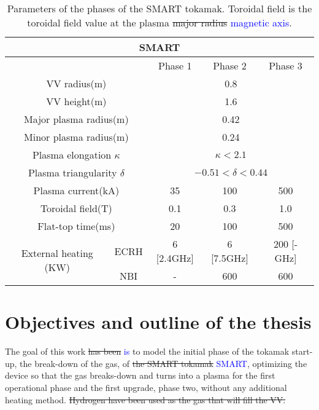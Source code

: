 \documentclass[a4paper,12pt,oneside]{book}
\begin{document}
\begin{table}[h!]
\centering
	\begin{tabular}{|c|c|c|c|c|} \hline
		\multicolumn{5}{|c|}{SMART}\\ \hline
		 \multicolumn{2}{|c|}{} & Phase 1 & Phase 2 & Phase 3 \\ \hline
		\multicolumn{2}{|c|}{VV radius(m)} & \multicolumn{3}{|c|}{0.8} \\ \hline
		\multicolumn{2}{|c|}{VV height(m)} & \multicolumn{3}{|c|}{1.6} \\ \hline
		\multicolumn{2}{|c|}{Major plasma radius(m)} & \multicolumn{3}{|c|}{0.42} \\ \hline
		\multicolumn{2}{|c|}{Minor plasma radius(m)} & \multicolumn{3}{|c|}{0.24} \\ \hline
		\multicolumn{2}{|c|}{Plasma elongation $\kappa$} & \multicolumn{3}{|c|}{$\kappa<2.1$} \\ \hline
		\multicolumn{2}{|c|}{Plasma triangularity $\delta$} & \multicolumn{3}{|c|}{$-0.51< \delta < 0.44$} \\ \hline
		\multicolumn{2}{|c|}{Plasma current(kA)} & 35 & 100 & 500  \\ \hline
		\multicolumn{2}{|c|}{Toroidal field(T)} & 0.1 & 0.3 & 1.0  \\ \hline
		\multicolumn{2}{|c|}{Flat-top time(ms)} & 20 & 100 & 500 \\ \hline
		\multirow{2}{*}{External heating (KW)} & ECRH & 6 [2.4GHz] & 6 [7.5GHz] & 200 [- GHz] \\ \cline{2-5}
		 & NBI  & - & 600 & 600 \\ \hline
	\end{tabular}
	\caption{Parameters of the phases of the SMART tokamak. Toroidal field is the toroidal field value at the plasma \st{major radius} \textcolor{blue}{magnetic axis}.}
	\label{table_SMART_parameters}
\end{table}
%

\section{Objectives and outline of the thesis}

The goal of this work \st{has been} \textcolor{blue}{is} to model the initial phase of the tokamak start-up, the break-down of the gas, of \st{the SMART tokamak} \textcolor{blue}{SMART}, optimizing the device so that the gas breaks-down and turns into a plasma for the first operational phase and the first upgrade, phase two, without any additional heating method. \st{Hydrogen have been used as the gas that will fill the VV.}
\end{document}
